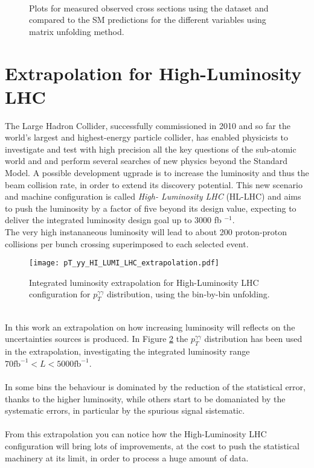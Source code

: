 \begin{figure}[t]
\centering
{} \qquad
{} \\
\caption{Plots for measured observed cross sections using the dataset and compared to the SM predictions for the different variables using matrix unfolding method.}
\label{combDatabinned_matrix}
\end{figure}
\newpage

\section{Extrapolation for High-Luminosity LHC}
The Large Hadron Collider, successfully commissioned in 2010 and so far the world's largest and highest-energy particle collider, has enabled physicists to investigate and test with high precision all the key questions of the sub-atomic world and and perform several searches of new physics beyond the Standard Model. A possible development ugprade is to increase the luminosity and thus the beam collision rate, in order to extend its discovery potential. This new scenario and machine configuration is called \emph{High- Luminosity LHC} (HL-LHC) and aims to push the luminosity by a factor of five beyond its design value, expecting to deliver the integrated luminosity design goal up to $3000$ fb $^{-1}$.
\\
The very high instananeous luminosity will lead to about 200 proton-proton collisions per bunch crossing superimposed to each selected event\cite{Apollinari_2017cqg, sekmen2019standard}.
\begin{figure}[b!]
\centering
\texttt{[image: pT\_yy\_HI\_LUMI\_LHC\_extrapolation.pdf]}
\caption{Integrated luminosity extrapolation for High-Luminosity LHC configuration for $p_T^{\gamma\gamma}$ distribution, using the bin-by-bin unfolding.}
\label{extrapolation}
\end{figure}
\\In this work an extrapolation on how increasing luminosity will reflects on the uncertainties sources is produced. In Figure \ref{extrapolation} the $p_T^{\gamma\gamma}$ distribution has been used in the extrapolation, investigating the integrated luminosity range $70 \text{fb}^{-1} < L < 5000 \text{fb}^{-1}$.
\\\\
In some bins the behaviour is dominated by the reduction of the statistical error, thanks to the higher luminosity, while others start to be domaniated by the systematic errors, in particular by the spurious signal sistematic.
\\\\
From this extrapolation you can notice how the High-Luminosity LHC configuration will bring lots of improvements, at the cost to push the statistical machinery at its limit, in order to process a huge amount of data. 